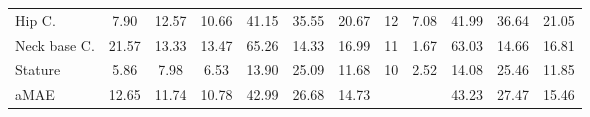 \begin{table}[t!]
\begin{center}
\begin{tabular}{|l|c|c|c|c|c|c|c|c|c|c|c|}
Hip C.      & 7.90    & 12.57   & 10.66 & 41.15   & 35.55 & 20.67               & 12   & 7.08   &41.99&36.64& 21.05  \\ 
Neck base C. & 21.57   & 13.33   & 13.47 & 65.26   & 14.33 & 16.99              & 11  & 1.67    &63.03&14.66& 16.81  \\
Stature               & 5.86    & 7.98    & 6.53 & 13.90    & 25.09 & 11.68     & 10 & 2.52   &14.08&25.46&  11.85   \\ \hline \hline
aMAE                     & 12.65   & 11.74   & 10.78 & 42.99   & 26.68 & 14.73  &      \multicolumn{2}{c|}{}   &43.23&27.47& 15.46 \\   \cline{1-7}  \cline{10-12}
\end{tabular}
\end{center}
\end{table}